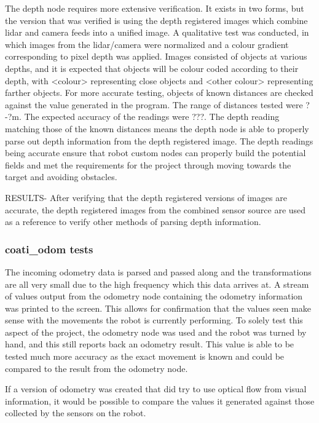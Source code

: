\documentclass{article}[12]
\begin{document}
	The depth node requires more extensive verification. It exists in two forms, but the version that was verified is using the depth registered images which combine lidar and camera feeds into a unified image. A qualitative test was conducted, in which images from the lidar/camera were normalized and a colour gradient corresponding to pixel depth was applied. Images consisted of objects at various depths, and it is expected that objects will be colour coded according to their depth, with <colour> representing close objects and <other colour> representing farther objects. 
For more accurate testing, objects of known distances are checked against the value generated in the program. The range of distances tested were ?-?m. The expected accuracy of the readings were ???. The depth reading matching those of the known distances means the depth node is able to properly parse out depth information from the depth registered image.
 The depth readings being accurate ensure that robot custom nodes can properly build the potential fields and met the requirements for the project through moving towards the target and avoiding obstacles. 

RESULTS- After verifying that the depth registered versions of images are accurate, the depth registered images from the combined sensor source are used as a reference to verify other methods of parsing depth information.
	
	\subsubsection{coati\_odom tests}
	
	The incoming odometry data is parsed and passed along and the transformations are all very small due to the high frequency which this data arrives at. A stream of values output from the odometry node containing the odometry information was printed to the screen. This allows for confirmation that the values seen make sense with the movements the robot is currently performing. 
	To solely test this aspect of the project, the odometry node was used and the robot was turned by hand, and this still reports back an odometry result. This value is able to be tested much more accuracy as the exact movement is known and could be compared to the result from the odometry node. 

	If a version of odometry was created that did try to use optical flow from visual information, it would be possible to compare the values it generated against those collected by the sensors on the robot.
	
\end{document}
